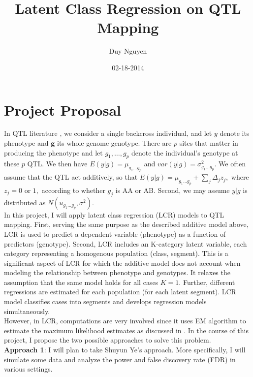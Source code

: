 \documentclass{article}
\begin{document}
\title{Latent Class Regression on QTL Mapping}         %
\author{Duy Nguyen}        %
\date{02-18-2014}          %
\maketitle
\section*{Project Proposal}
In QTL literature \cite{Broman},  we consider a single backcross individual, and let $y$ denote its phenotype and $\mathbf{g}$ its whole  genome genotype. There are $p$ sites that matter in producing the phenotype and let $g_1,\ldots,g_p$ denote the individual's genotype at these $p$ QTL. We then have $E(y|g)=\mu_{g_1\ldots g_p}$ and $var(y|g)=\sigma^2_{g_1\ldots g_p}.$  We often assume that the QTL act additively, so that $E(y|g)=\mu_{g_1\ldots g_p} + \sum_{j} \Delta_j z_j,$ where $z_j=0$ or $1,$ according to whether $g_j$ is AA or AB. Second, we may assume $y|g $ is distributed as $ N(u_{g_1\ldots g_p}, \sigma^2).$ \\

In this project, I will apply latent class regression (LCR) models to QTL mapping. First, serving the same purpose as the described additive model above, LCR is used to predict a dependent variable (phenotype) as a function of predictors (genotype). Second, LCR includes an K-category latent variable, each category representing a homogenous population (class, segment). This is a significant aspect of LCR for which the additive model does not account when modeling the relationship between phenotype and genotypes. It relaxes the assumption that the same model holds for all cases $K=1.$ Further, different regressions are estimated for each population (for each latent segment). LCR model classifies cases into segments and develops regression models simultaneously.   \\

However, in LCR, computations are very involved since it uses EM algorithm to estimate the maximum likelihood estimates as discussed in \cite{Leisch}. In the course of this project, I propose the two possible approaches to solve this problem.\\

\textbf{Approach 1}: I will plan to take Shuyun Ye's approach. More specifically, I will simulate some data and analyze the power and false discovery rate (FDR) in various settings. \\
\end{document}
